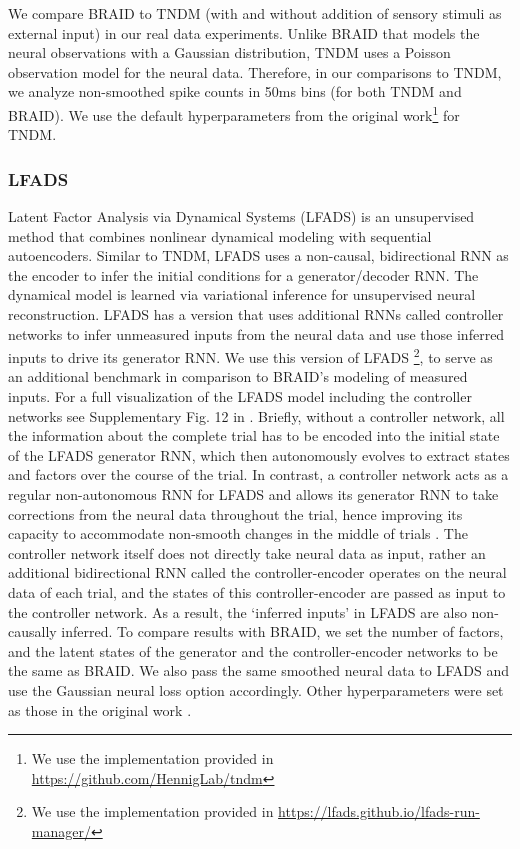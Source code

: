 \documentclass{article} %
\newcommand{\ourmethod}{BRAID}
\begin{document}
We compare \ourmethod{} to TNDM (with and without addition of sensory stimuli as external input) in our real data experiments. Unlike \ourmethod{} that models the neural observations with a Gaussian distribution, TNDM uses a Poisson observation model for the neural data. Therefore, in our comparisons to TNDM, we analyze non-smoothed spike counts in 50ms bins (for both TNDM and \ourmethod{}). We use the default hyperparameters from the original work\footnote{We use the implementation provided in \url{https://github.com/HennigLab/tndm}} for TNDM.

\subsubsection{LFADS}\label{app:LFADS_method}

Latent Factor Analysis via Dynamical Systems (LFADS) \citep{pandarinath2018inferring} is an unsupervised method that combines nonlinear dynamical modeling with sequential autoencoders. Similar to TNDM, LFADS uses a non-causal, bidirectional RNN as the encoder to infer the initial conditions for a generator/decoder RNN. The dynamical model is learned via variational inference for unsupervised neural reconstruction. LFADS has a version that uses additional RNNs called controller networks to infer unmeasured inputs from the neural data and use those inferred inputs to drive its generator RNN. We use this version of LFADS \citep{dan_o_shea_2021_5790162}\footnote{We use the implementation provided in \url{https://lfads.github.io/lfads-run-manager/}}, to serve as an additional benchmark in comparison to \ourmethod{}'s modeling of measured inputs. 
For a full visualization of the LFADS model including the controller networks see Supplementary Fig. 12 in \citealp{pandarinath2018inferring}. Briefly, without a controller network, all the information about the complete trial has to be encoded into the initial state of the LFADS generator RNN, which then autonomously evolves to extract states and factors over the course of the trial. In contrast, a controller network acts as a regular non-autonomous RNN for LFADS and allows its generator RNN to take corrections from the neural data throughout the trial, hence improving its capacity to accommodate non-smooth changes in the middle of trials \citep{pandarinath2018inferring}. The controller network itself does not directly take neural data as input, rather an additional bidirectional RNN called the controller-encoder operates on the neural data of each trial, and the states of this controller-encoder are passed as input to the controller network. As a result, the `inferred inputs' in LFADS are also non-causally inferred. To compare results with \ourmethod{}, we set the number of factors, and the latent states of the generator and the controller-encoder networks to be the same as \ourmethod{}. We also pass the same smoothed neural data to LFADS and use the Gaussian neural loss option accordingly. Other hyperparameters were set as those in the original work \citep{pandarinath2018inferring}.  
\end{document}
